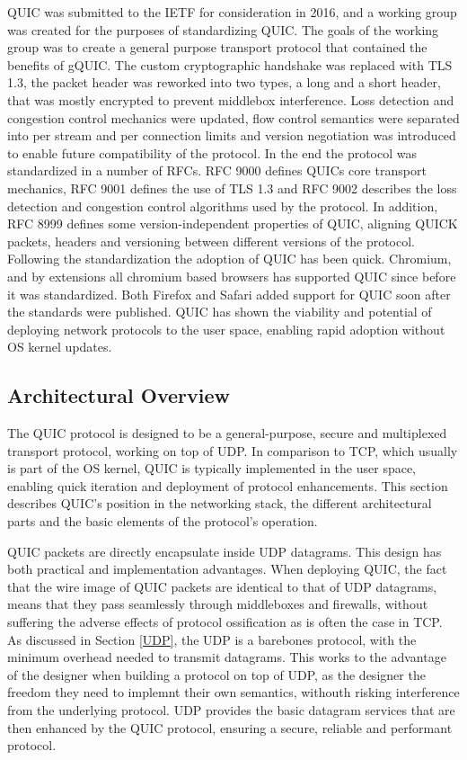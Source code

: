 \documentclass[english, 12pt, a4paper, elec, utf8, a-2b, online]{aaltothesis}
\begin{document}
QUIC was submitted to the IETF for consideration in 2016, and a working group
was created for the purposes of standardizing QUIC. The goals of the working group
was to create a general purpose transport protocol that contained the benefits
of gQUIC. The custom cryptographic handshake was replaced with TLS 1.3, the packet header
was reworked into two types, a long and a short header, that was mostly encrypted
to prevent middlebox interference. Loss detection and congestion control mechanics
were updated, flow control semantics were separated into per stream and per connection
limits and version negotiation was introduced to enable future compatibility of the
protocol\cite{rfc9000}. In the end the protocol was standardized in a number of RFCs.
RFC 9000\cite{rfc9000} defines QUICs core transport mechanics, RFC 9001\cite{rfc9001} defines the use of TLS 1.3
and RFC 9002\cite{rfc9002} describes the loss detection and congestion control algorithms used by the
protocol. In addition, RFC 8999\cite{rfc8999} defines some version-independent
properties of QUIC, aligning QUICK packets, headers and versioning between
different versions of the protocol. Following the standardization the adoption
of QUIC has been quick. Chromium, and by extensions all chromium based browsers
has supported QUIC since before it was standardized\cite{chromium_quic}. Both
Firefox\cite{firefox_quic} and Safari\cite{safari_quic} added support for QUIC
soon after the standards were published. QUIC has shown the viability and potential
of deploying network protocols to the user space, enabling rapid adoption without
OS kernel updates.

\subsection{Architectural Overview}

The QUIC protocol is designed to be a general-purpose, secure and multiplexed
transport protocol, working on top of UDP. In comparison to TCP, which usually
is part of the OS kernel, QUIC is typically implemented in the user space, enabling
quick iteration and deployment of protocol enhancements. This section describes
QUIC's position in the networking stack, the different architectural parts and the
basic elements of the protocol's operation.

QUIC packets are directly encapsulate inside UDP datagrams. This design has both 
practical and implementation advantages. When deploying QUIC, the fact that the
wire image of QUIC packets are identical to that of UDP datagrams, means that they
pass seamlessly through middleboxes and firewalls, without suffering the adverse
effects of protocol ossification as is often the case in TCP. As discussed in Section \ref{UDP},
the UDP is a barebones protocol, with the minimum overhead needed to transmit datagrams. This
works to the advantage of the designer when building a protocol on top of UDP, as
the designer the freedom they need to implemnt their own semantics, withouth risking
interference from the underlying protocol. UDP provides the basic datagram services
that are then enhanced by the QUIC protocol, ensuring a secure, reliable and performant
protocol\cite{quic_transport_protocol_design}.
\end{document}

